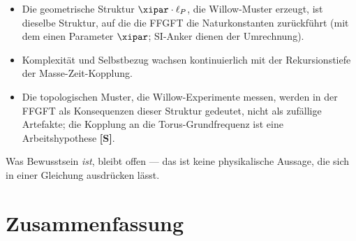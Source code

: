 \begin{conclusionBox}
\begin{itemize}
    \item Die geometrische Struktur $\xipar \cdot \ell_P$, die Willow-Muster erzeugt,
    ist dieselbe Struktur, auf die die FFGFT die Naturkonstanten zurückführt
    (mit dem einen Parameter $\xipar$; SI-Anker dienen der Umrechnung).
    \item Komplexität und Selbstbezug wachsen kontinuierlich mit der
    Rekursionstiefe der Masse-Zeit-Kopplung.
    \item Die topologischen Muster, die Willow-Experimente messen, werden in der FFGFT
    als Konsequenzen dieser Struktur gedeutet, nicht als zufällige Artefakte; die
    Kopplung an die Torus-Grundfrequenz ist eine Arbeitshypothese \textbf{[S]}.
\end{itemize}
Was Bewusstsein \textit{ist}, bleibt offen — das ist keine physikalische Aussage,
die sich in einer Gleichung ausdrücken lässt.
\end{conclusionBox}


\section{Zusammenfassung}

\begin{table}[ht]
\centering
{}
\caption{Drei Willow-Ergebnisse und ihre FFGFT-Deutung}
\end{table}

